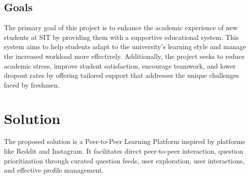 \subsection{Goals}
The primary goal of this project is to enhance the academic experience of new students at SIT by providing them with a supportive educational system. This system aims to help students adapt to the university's learning style and manage the increased workload more effectively. Additionally, the project seeks to reduce academic stress, improve student satisfaction, encourage teamwork, and lower dropout rates by offering tailored support that addresses the unique challenges faced by freshmen.

\section{Solution}\label{solution}
The proposed solution is a Peer-to-Peer Learning Platform inspired by platforms like Reddit and Instagram. It facilitates direct peer-to-peer interaction, question prioritization through curated question feeds, user exploration, user interactions, and effective profile management.





 

